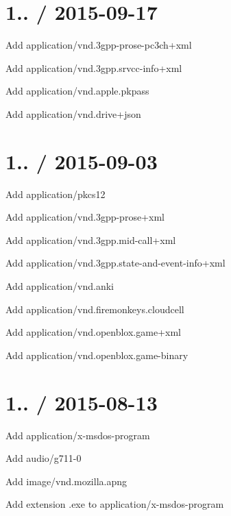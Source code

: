 \section*{1.. / 2015-\/09-\/17 }


\begin{DoxyItemize}
\item Add {\ttfamily application/vnd.\+3gpp-\/prose-\/pc3ch+xml}
\item Add {\ttfamily application/vnd.\+3gpp.\+srvcc-\/info+xml}
\item Add {\ttfamily application/vnd.\+apple.\+pkpass}
\item Add {\ttfamily application/vnd.\+drive+json}
\end{DoxyItemize}

\section*{1.. / 2015-\/09-\/03 }


\begin{DoxyItemize}
\item Add {\ttfamily application/pkcs12}
\item Add {\ttfamily application/vnd.\+3gpp-\/prose+xml}
\item Add {\ttfamily application/vnd.\+3gpp.\+mid-\/call+xml}
\item Add {\ttfamily application/vnd.\+3gpp.\+state-\/and-\/event-\/info+xml}
\item Add {\ttfamily application/vnd.\+anki}
\item Add {\ttfamily application/vnd.\+firemonkeys.\+cloudcell}
\item Add {\ttfamily application/vnd.\+openblox.\+game+xml}
\item Add {\ttfamily application/vnd.\+openblox.\+game-\/binary}
\end{DoxyItemize}

\section*{1.. / 2015-\/08-\/13 }


\begin{DoxyItemize}
\item Add {\ttfamily application/x-\/msdos-\/program}
\item Add {\ttfamily audio/g711-\/0}
\item Add {\ttfamily image/vnd.\+mozilla.\+apng}
\item Add extension {\ttfamily .exe} to {\ttfamily application/x-\/msdos-\/program}
\end{DoxyItemize}

